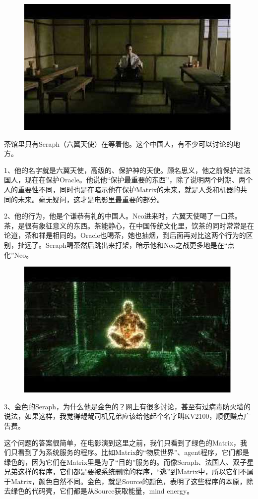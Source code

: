 \documentclass{ctexart}
\begin{document}
\begin{figure}[htb]
\centering
\includegraphics[width=0.5\linewidth]{fig/read_reloaded-58}
\end{figure}

茶馆里只有Seraph（六翼天使）在等着他。这个中国人，有不少可以讨论的地方。

1、他的名字就是六翼天使，高级的、保护神的天使。顾名思义，他之前保护过法国人，现在在保护Oracle。他说他“保护最重要的东西”，除了说明两个时期、两个人的重要性不同，同时也是在暗示他在保护Matrix的未来，就是人类和机器的共同的未来。毫无疑问，这才是电影里最重要的部分。

2、他的行为，他是个谦恭有礼的中国人。Neo进来时，六翼天使喝了一口茶。茶，是很有象征意义的东西。茶能静心，在中国传统文化里，饮茶的同时常常是在论道，茶和禅是相同的。Oracle也喝茶，她也抽烟，到后面再对比这两个行为的区别，扯远了。Seraph喝茶然后跳出来打架，暗示他和Neo之战更多地是在“点化”Neo。

\begin{figure}[htb]
\centering
\includegraphics[width=0.5\linewidth]{fig/read_reloaded-59}
\end{figure}

3、金色的Seraph，为什么他是金色的？网上有很多讨论，甚至有过病毒防火墙的说法，如果这样，我觉得龌龊司机兄弟应该给他起个名字叫KV2100，顺便赚点广告费。

这个问题的答案很简单，在电影演到这里之前，我们只看到了绿色的Matrix，我们只看到了为系统服务的程序。比如Matrix的“物质世界”、agent程序，它们都是绿色的，因为它们在Matrix里是为了“目的”服务的。而像Seraph、法国人、双子星兄弟这样的程序，它们都是要被系统删除的程序，“逃”到Matrix中，所以它们不属于Matrix，颜色自然不同。金色，就是Source的颜色，表明了这些程序的本原，除去绿色的代码壳，它们都是从Source获取能量，mind energy。
\end{document}
